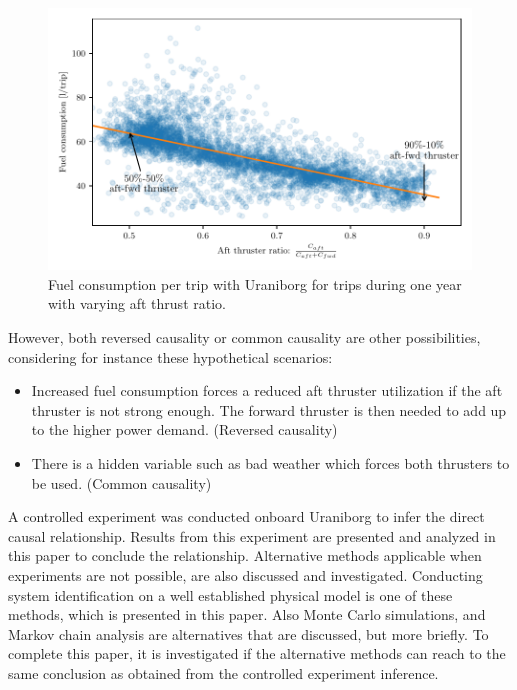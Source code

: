 \begin{figure}[!htb]
    \centering
    \includegraphics[width=\textwidth]{figures/correlation.pdf}
    \caption{Fuel consumption per trip with Uraniborg for trips during one year with varying aft thrust ratio.}
    \label{fig:fuel_consumption_correlation}
\end{figure}
However, both reversed causality or common causality are other possibilities, considering for instance these hypothetical scenarios:
\begin{itemize}
    \item Increased fuel consumption forces a reduced aft thruster utilization if the aft thruster is not strong enough. The forward thruster is then needed to add up to the higher power demand. (Reversed causality)

    \item There is a hidden variable such as bad weather which forces both thrusters to be used. (Common causality)
\end{itemize}

A controlled experiment was conducted onboard Uraniborg to infer the direct causal relationship. Results from this experiment are presented and analyzed in this paper to conclude the relationship. Alternative methods applicable when experiments are not possible, are also discussed and investigated. Conducting system identification on a well established physical model is one of these methods, which is presented in this paper. Also Monte Carlo simulations, and Markov chain analysis are alternatives that are discussed, but more briefly. To complete this paper, it is investigated if the alternative methods can reach to the same conclusion as obtained from the controlled experiment inference.